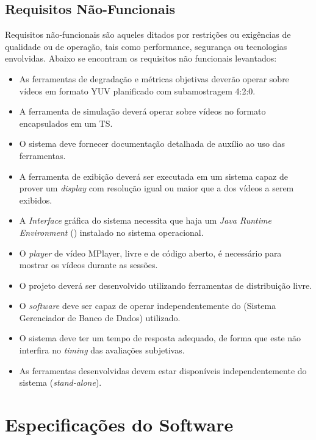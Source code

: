 \subsection{Requisitos Não-Funcionais}
\label{met:reqnaofunc}

Requisitos não-funcionais são aqueles ditados por restrições ou exigências de qualidade ou de operação, tais como performance, segurança ou tecnologias envolvidas.
Abaixo se encontram os requisitos não funcionais levantados:


\begin{itemize}
	\item As ferramentas de degradação e métricas objetivas deverão operar sobre vídeos em formato YUV planificado com subamostragem 4:2:0.
	\item A ferramenta de simulação deverá operar sobre vídeos no formato  encapsulados em um TS.
	\item O sistema deve fornecer documentação detalhada de auxílio ao uso das ferramentas.
	\item A ferramenta de exibição deverá ser executada em um sistema capaz de prover um \emph{display} com resolução igual ou maior que a dos vídeos a serem exibidos.
	\item A \emph{Interface} gráfica do sistema necessita que haja um \emph{Java Runtime Environment} () instalado no sistema operacional.
	\item O \emph{player} de vídeo MPlayer, livre e de código aberto, é necessário para mostrar os vídeos durante as sessões.
	\item O projeto deverá ser desenvolvido utilizando ferramentas de distribuição livre.
	\item O \emph{software} deve ser capaz de operar independentemente do  (Sistema Gerenciador de Banco de Dados) utilizado.
	\item O sistema deve ter um tempo de resposta adequado, de forma que este não interfira no \emph{timing} das avaliações subjetivas.
	\item As ferramentas desenvolvidas devem estar disponíveis independentemente do sistema (\emph{stand-alone}).
\end{itemize}

\section{Especificações do Software}

